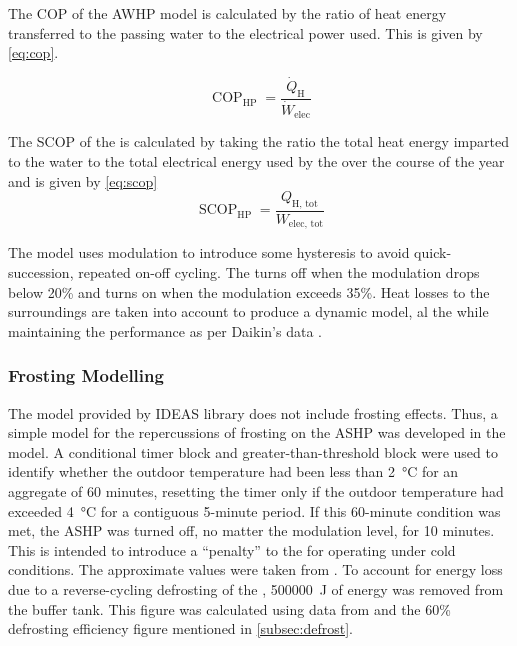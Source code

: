 The \ac{COP} of the \ac{AWHP} model is calculated by the ratio of heat energy transferred to the passing water to the electrical power used. This is given by \cref{eq:cop}. 

\begin{equation}
    \operatorname{COP}_\text{HP}=\frac{\dot{Q}_\text{H}}{\dot{W}_\text{elec}}\label{eq:cop}
\end{equation}

The \ac{SCOP} of the \HP is calculated by taking the ratio the total heat energy imparted to the water to the total electrical energy used by the \HP over the course of the year and is given by \cref{eq:scop}
\begin{equation}
    \operatorname{SCOP}_\text{HP}=\frac{Q_\text{H, tot}}{W_\text{elec, tot}}\label{eq:scop}
\end{equation}

The model uses modulation to introduce some hysteresis to avoid quick-succession, repeated on-off cycling. The \HP turns off when the modulation drops below 20\% and turns on when the modulation exceeds 35\%. Heat losses to the surroundings are taken into account to produce a dynamic model, al the while maintaining the performance as per Daikin's data \cite{daikin_altherma_tech_2006}.

\subsubsection{Frosting Modelling}
The model provided by IDEAS library does not include frosting effects. Thus, a simple model for the repercussions of frosting on the \ac{ASHP} was developed in the \modelica model. A conditional timer block and greater-than-threshold block were used to identify whether the outdoor temperature had been less than \qty{2}{\celsius} for an aggregate of 60 minutes, resetting the timer only if the outdoor temperature had exceeded \qty{4}{\celsius} for a contiguous 5-minute period. If this 60-minute condition was met, the \ac{ASHP} was turned off, no matter the modulation level, for 10 minutes. This is intended to introduce a ``penalty'' to the \HP for operating under cold conditions. The approximate values were taken from \citeauthor{sandstrom_frosting_2021} \cite{sandstrom_frosting_2021}. To account for energy loss due to a reverse-cycling defrosting of the \HP, \qty{500000}{\joule} of energy was removed from the buffer tank. This figure was calculated using data from \citeauthor{sandstrom_frosting_2021} \cite{sandstrom_frosting_2021} and the 60\% defrosting efficiency figure mentioned in \cref{subsec:defrost}. 

